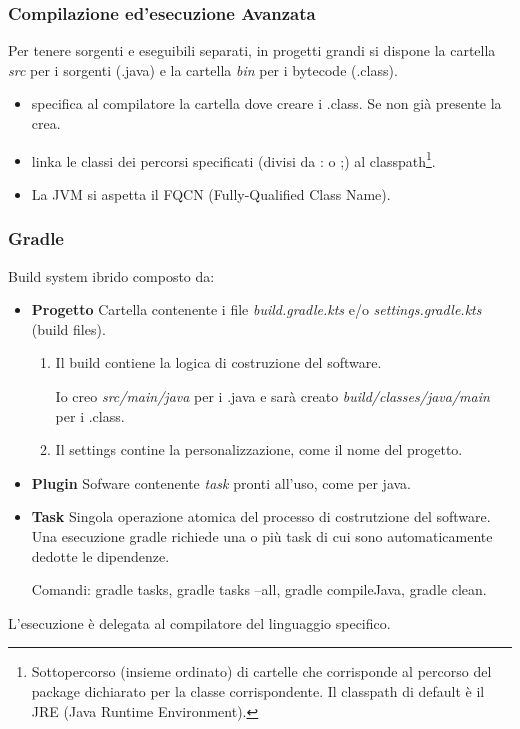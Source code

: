 \subsubsection{Compilazione ed'esecuzione Avanzata}
Per tenere sorgenti e eseguibili separati, in progetti grandi si dispone la cartella \textit{src} per i sorgenti (.java) e la cartella \textit{bin} per i bytecode (.class).



\begin{itemize}
	\item {} specifica al compilatore la cartella dove creare i .class. Se non già presente la crea.
	\item {} linka le classi dei percorsi specificati (divisi da : o ;) al classpath\footnote{Sottopercorso (insieme ordinato) di cartelle che corrisponde al percorso del package dichiarato per la classe corrispondente. Il classpath di default è il JRE (Java Runtime Environment).}.
	\item La JVM si aspetta il FQCN (Fully-Qualified Class Name).
\end{itemize}

\subsubsection{Gradle}
Build system ibrido composto da:
\begin{itemize}
	\item \textbf{Progetto} Cartella contenente i file \textit{build.gradle.kts} e/o \textit{settings.gradle.kts} (build files).
	\begin{enumerate}
		\item Il build contiene la logica di costruzione del software.


		Io creo \textit{src/main/java} per i .java e sarà creato \textit{build/classes/java/main} per i .class.
		\item Il settings contine la personalizzazione, come il nome del progetto.

	\end{enumerate}
	\item \textbf{Plugin} Sofware contenente \textit{task} pronti all'uso, come per java.
	\item \textbf{Task} Singola operazione atomica del processo di costrutzione del software. Una esecuzione gradle richiede una o più task di cui sono automaticamente dedotte le dipendenze.

	Comandi: gradle tasks, gradle tasks --all, gradle compileJava, gradle clean.
\end{itemize}
L'esecuzione è delegata al compilatore del linguaggio specifico.

